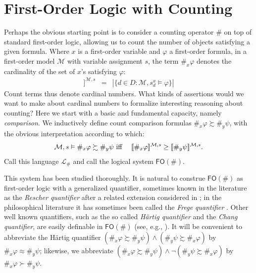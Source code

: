 \documentclass[12pt,oneside,reqno]{amsart}
\newcommand{\semantics}[1]{[\![\mbox{\em $ #1 $\/}]\!]}
\theoremstyle{definition}
\begin{document}
\section{First-Order Logic with Counting} \label{section:first-order}
Perhaps the obvious starting point is to consider a counting operator $\#$ on top of standard first-order logic, allowing us to count the number of objects satisfying a given formula. Where $x$ is a first-order variable and $\varphi$ a first-order formula, in a first-order model $\mathcal{M}$ with variable assignment $s$, the term $\#_x\varphi$ denotes the cardinality of the set of $x$'s satisfying $\varphi$: \begin{eqnarray*} \semantics{\#_x\varphi}^{\mathcal{M},s} & = &  |\{d \in D: \mathcal{M},s^x_d \models \varphi\}| \end{eqnarray*} 
Count terms thus denote cardinal numbers. What kinds of assertions would we want to make about cardinal numbers to formalize interesting reasoning about counting? Here we start with a basic and fundamental capacity, namely \emph{comparison}. We inductively define count comparison formulas $\#_x\varphi \succsim \#_y\psi$, with the obvious interpretation according to which: \begin{eqnarray*} \mathcal{M},s \vDash \#_x\varphi \succsim \#_y\psi & \mbox{ iff }  & \semantics{\#_x\varphi}^{\mathcal{M},s} \geq \semantics{\#_y\psi}^{\mathcal{M},s}. \end{eqnarray*}
Call this language $\mathcal{L}_\#$ and call the logical system $\mathsf{FO}(\#)$.

This system has been studied thoroughly. It is natural to construe $\mathsf{FO}(\#)$ as first-order logic with a generalized quantifier, sometimes known in the literature as the \emph{Rescher quantifier} \citep{hartig,Otto} after a related extension considered in \cite{rescher}; in the philosophical literature it has sometimes been called the \emph{Frege quantifier} \citep{antonelli2010}. Other well known quantifiers, such as the so called \emph{H\"{a}rtig quantifier} and the \emph{Chang quantifier}, are easily definable in $\mathsf{FO}(\#)$ (see, e.g., \citealt{PetersWesterstahl}). It will be convenient to abbreviate  the H\"{a}rtig quantifier $(\#_x\varphi \succsim \#_y\psi) \wedge (\#_y\psi \succsim \#_x\varphi)$ by $\#_x\varphi \approx \#_y \psi$; likewise, we abbreviate $(\#_x\varphi \succsim \#_y\psi) \wedge \neg (\#_y\psi \succsim \#_x\varphi)$ by $\#_x\varphi \succ \#_y \psi$.
\end{document}
